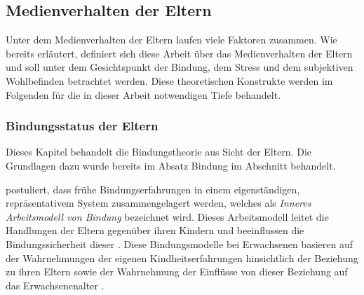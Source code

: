\subsection{Medienverhalten der Eltern}\label{sec:Medienverhalten}
Unter dem Medienverhalten der Eltern laufen viele Faktoren zusammen. Wie bereits erläutert, definiert sich diese Arbeit über das Medienverhalten der Eltern und soll unter dem Gesichtspunkt der Bindung, dem Stress und dem subjektiven Wohlbefinden betrachtet werden. Diese theoretischen Konstrukte werden im Folgenden für die in dieser Arbeit notwendigen Tiefe behandelt.

\subsubsection{Bindungsstatus der Eltern}\label{sec:Bindungsstatus}
Dieses Kapitel behandelt die Bindungstheorie aus Sicht der Eltern. Die Grundlagen dazu wurde bereits im Absatz Bindung im Abschnitt  behandelt.

 postuliert, dass frühe Bindungserfahrungen in einem eigenständigen, repräsentativem System zusammengelagert werden, welches als \textit{Inneres Arbeitsmodell von Bindung} bezeichnet wird. Dieses Arbeitsmodell leitet die Handlungen der Eltern gegenüber ihren Kindern und beeinflussen die Bindungssicherheit dieser \cite{Siegler2008}. Diese Bindungsmodelle bei Erwachsenen basieren auf der Wahrnehmungen der eigenen Kindheitserfahrungen hinsichtlich der Beziehung zu ihren Eltern sowie der Wahrnehmung der Einflüsse von dieser Beziehung auf das Erwachsenenalter \cite{Main1985}.

